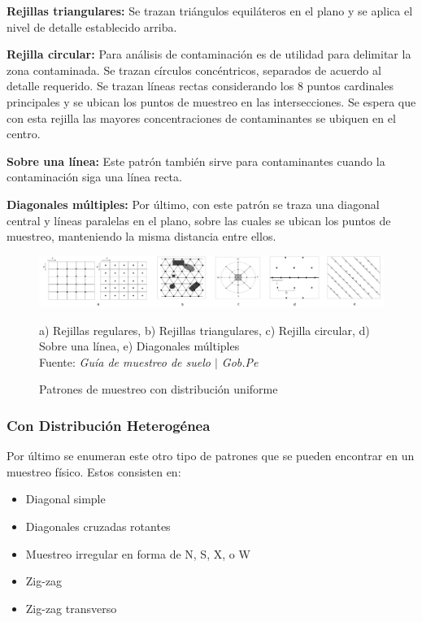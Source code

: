 \documentclass[conference]{IEEEtran}
\begin{document}
\bigbreak

\textbf{Rejillas triangulares:} Se trazan triángulos equiláteros en el plano y se aplica el nivel de detalle establecido arriba.

\bigbreak

\textbf{Rejilla circular:} Para análisis de contaminación es de utilidad para delimitar la zona contaminada. Se trazan círculos concéntricos, separados de acuerdo al detalle requerido. Se trazan líneas rectas considerando los 8 puntos cardinales principales y se ubican los puntos de muestreo en las intersecciones. Se espera que con esta rejilla las mayores concentraciones de contaminantes se ubiquen en el centro.

\bigbreak

\textbf{Sobre una línea:} Este patrón también sirve para contaminantes cuando la contaminación siga una línea recta.

\bigbreak

\textbf{Diagonales múltiples:} Por último, con este patrón se traza una diagonal central y líneas paralelas en el plano, sobre las cuales se ubican los puntos de muestreo, manteniendo la misma distancia entre ellos.

\begin{figure}[H]
    \centering
    \includegraphics[width=0.4\paperwidth]{ref/uniform-sampling-patterns.png}
    \caption{Patrones de muestreo con distribución uniforme} \footnotesize
    a) Rejillas regulares, b) Rejillas triangulares, c) Rejilla circular, d) Sobre una línea, e) Diagonales múltiples \\
    Fuente: \textit{Guía de muestreo de suelo $\mid$ Gob.Pe} \cite{gobpe-ministerio-del-ambiente-2014}
\end{figure}


\subsubsection{Con Distribución Heterogénea}

Por último se enumeran este otro tipo de patrones que se pueden encontrar en un muestreo físico. Estos consisten en:

\begin{itemize}
    \item Diagonal simple
    \item Diagonales cruzadas rotantes
    \item Muestreo irregular en forma de N, S, X, o W
    \item Zig-zag
    \item Zig-zag transverso
\end{itemize}
\end{document}
